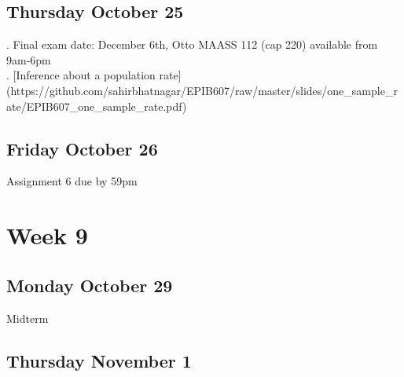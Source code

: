 \documentclass[]{book}
\let\originaltabular\tabular
\let\endoriginaltabular\endtabular
\renewenvironment{tabular}[1]{%
  \begingroup%
  \centering%
  \originaltabular{#1}}%
  {\endoriginaltabular\endgroup}
\theoremstyle{definition}
\theoremstyle{definition}
\theoremstyle{definition}
\theoremstyle{remark}
\begin{document}
\subsection{Thursday October 25}\label{thursday-october-25}

\begin{table}[H]
\centering
\begin{tabular}{l}
. Final exam date: December 6th, Otto MAASS 112 (cap 220) available from 9am-6pm\\
. [Inference about a population rate](https://github.com/sahirbhatnagar/EPIB607/raw/master/slides/one\_sample\_rate/EPIB607\_one\_sample\_rate.pdf)\\
\hline
\end{tabular}
\end{table}

\subsection{Friday October 26}\label{friday-october-26}

\begin{table}[H]
\centering
\begin{tabular}{l}
\hline
Assignment 6 due by 59pm\\
\hline
\end{tabular}
\end{table}

\section{Week 9}\label{week-9}

\subsection{Monday October 29}\label{monday-october-29}

\begin{table}[H]
\centering
\begin{tabular}{l}
\hline
Midterm\\
\hline
\end{tabular}
\end{table}

\subsection{Thursday November 1}\label{thursday-november-1}

\begin{table}[H]
\centering
\begin{tabular}{l}
\hline
\\
\hline
\end{tabular}
\end{table}
\end{document}
